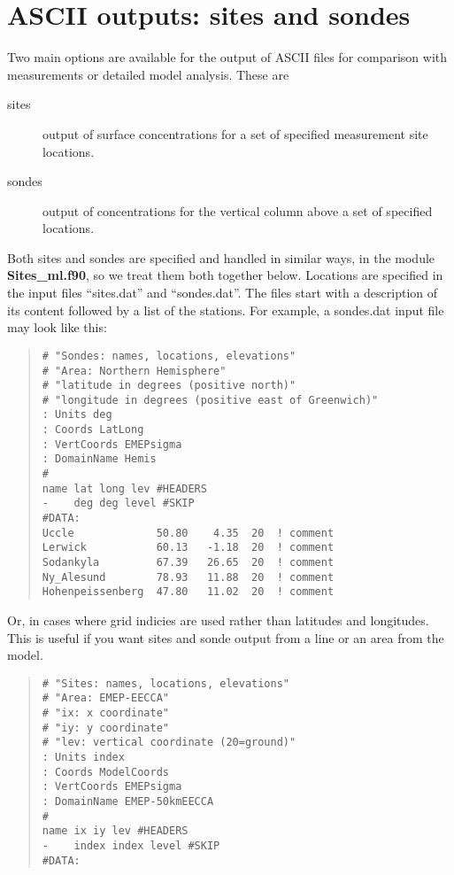 \newpage
\section{ASCII outputs: sites and sondes}\label{sec:sitesonde}


Two main options are available for the output of ASCII files for comparison
with measurements or detailed model analysis. These are

\begin{description}
\item[sites]  

      output of surface concentrations for a set of specified
      measurement site locations.
\item[sondes] 

      output of concentrations for the vertical column above
     a set of specified locations.
\end{description}

Both sites and sondes are specified and handled in similar ways, in
the module {\bf Sites\_ml.f90}, so we treat them both together below.
Locations are specified in the input files ``sites.dat'' and ``sondes.dat''. 
The files start with a description of its content
followed by a list of the stations. For example, a sondes.dat input file
may look like this:

\begin{small}
\begin{quote}
\begin{verbatim}
# "Sondes: names, locations, elevations"
# "Area: Northern Hemisphere"
# "latitude in degrees (positive north)"
# "longitude in degrees (positive east of Greenwich)"
: Units deg
: Coords LatLong
: VertCoords EMEPsigma
: DomainName Hemis
#
name lat long lev #HEADERS
-    deg deg level #SKIP
#DATA:
Uccle             50.80    4.35  20  ! comment
Lerwick           60.13   -1.18  20  ! comment
Sodankyla         67.39   26.65  20  ! comment
Ny_Alesund        78.93   11.88  20  ! comment
Hohenpeissenberg  47.80   11.02  20  ! comment
\end{verbatim}

\end{quote}
\end{small}

Or, in cases where grid indicies are used rather than latitudes and 
longitudes. This is useful if you want sites and sonde output from a line 
or an area from the model. 

\begin{small}
\begin{quote}
\begin{verbatim}
# "Sites: names, locations, elevations"
# "Area: EMEP-EECCA"
# "ix: x coordinate"
# "iy: y coordinate"
# "lev: vertical coordinate (20=ground)"
: Units index
: Coords ModelCoords
: VertCoords EMEPsigma
: DomainName EMEP-50kmEECCA
#
name ix iy lev #HEADERS
-    index index level #SKIP
#DATA:
\end{verbatim}

\end{quote}
\end{small}

